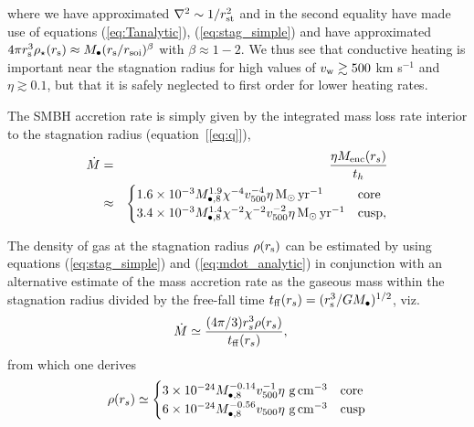 \documentclass[usenatbib,fleqn]{mn2e}
\newcommand{\rs}{r_s}
\newcommand{\Menc}{M_{\rm enc}}
\newcommand{\Mbheight}{M_{\bullet,8}}
\newcommand{\ff}{\rm ff}
\newcommand{\pyear}{{\rm yr}^{-1}}
\renewcommand{\th}{t_h}
\begin{document}
where we have approximated $\nabla^{2} \sim 1/r_{\rm st}^{2}$ and in the second equality have made use of equations (\ref{eq:Tanalytic}), (\ref{eq:stag_simple}) and have approximated $4\pi r_{\rm s}^{3}\rho_{\star}(r_{\rm s}) \approx M_{\bullet}(r_{\rm s}/r_{\rm soi})^{\beta}$ with $\beta \approx 1-2$.  We thus see that conductive heating is important near the stagnation radius for high values of $v_{\rm w} \gtrsim 500$ km s$^{-1}$ and $\eta \gtrsim 0.1$, but that it is safely neglected to first order for lower heating rates.

The SMBH accretion rate is simply given by the integrated mass loss
rate interior to the stagnation radius (equation~[\ref{eq:q}]), 
\begin{eqnarray}
  \dot{M} &=& \frac{\eta \Menc(\rs)}{\th} \nonumber \\
&\approx&
  \begin{cases}
    1.6 \times 10^{-3} M_{\bullet,8}^{1.9}
    \chi^{-4} v_{500}^{-4}  \eta \Msun \, \pyear& \text{core} \\
    3.4 \times 10^{-3} \Mbheight^{1.4} \chi^{-2}
    \chi^{-2} v_{500}^{-2}  \eta \Msun \, \pyear  & \text{cusp}, 
  \end{cases}
  \label{eq:mdot_analytic}
\end{eqnarray}



The density of gas at the stagnation radius $\rho(r_{\rm s})$ can be estimated by using equations (\ref{eq:stag_simple}) and (\ref{eq:mdot_analytic}) in conjunction with an alternative estimate of the mass accretion rate as the gaseous mass within the stagnation radius divided by the free-fall time $t_{\rm ff}(\rs) = (r_{\rm s}^{3}/GM_{\bullet})^{1/2}$, viz.
\begin{align}
  &\dot{M}\simeq\frac{(4 \pi/3) \rs^3 \rho(\rs)}{t_{\ff}(\rs)},
  \label{eq:mdot_gas}
\end{align}
from which one derives 
\begin{align}
  \rho(\rs)\simeq
  \begin{cases}
    3 \times 10^{-24} \Mbheight^{-0.14} v_{500}^{-1}  \eta \,
    \, {\rm g \, cm^{-3}}& \text{core}\\
    6 \times 10^{-24}  \Mbheight^{-0.56} v_{500}    \eta \,\, {\rm g \,cm^{-3}} & \text{cusp}
  \end{cases}
  \label{eq:rhors}
\end{align}
\end{document}
